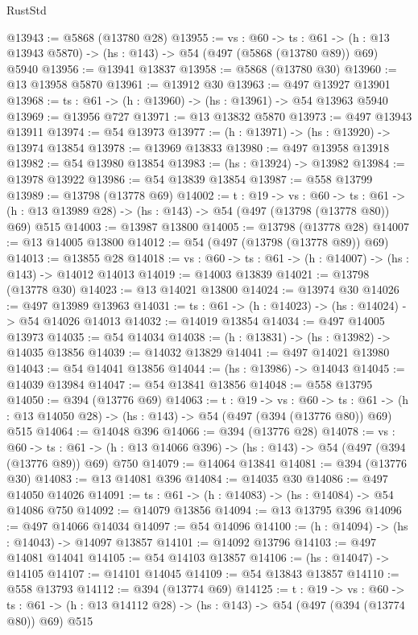 \begin{lexlean}{RustStd}
\begin{coremodule}
@13943 := @5868 (@13780 @28)
@13955 := {vs : @60} ->
  {ts : @61} -> (h : @13 @13943 @5870) -> (hs : @143) -> @54 (@497 (@5868 (@13780 @89)) @69) @5940
@13956 := @13941 @13837
@13958 := @5868 (@13780 @30)
@13960 := @13 @13958 @5870
@13961 := @13912 @30
@13963 := @497 @13927 @13901
@13968 := {ts : @61} -> (h : @13960) -> (hs : @13961) -> @54 @13963 @5940
@13969 := @13956 @727
@13971 := @13 @13832 @5870
@13973 := @497 @13943 @13911
@13974 := @54 @13973
@13977 := (h : @13971) -> (hs : @13920) -> @13974 @13854
@13978 := @13969 @13833
@13980 := @497 @13958 @13918
@13982 := @54 @13980 @13854
@13983 := (hs : @13924) -> @13982
@13984 := @13978 @13922
@13986 := @54 @13839 @13854
@13987 := @558 @13799
@13989 := @13798 (@13778 @69)
@14002 := {t : @19} ->
  {vs : @60} ->
  {ts : @61} -> (h : @13 @13989 @28) -> (hs : @143) -> @54 (@497 (@13798 (@13778 @80)) @69) @515
@14003 := @13987 @13800
@14005 := @13798 (@13778 @28)
@14007 := @13 @14005 @13800
@14012 := @54 (@497 (@13798 (@13778 @89)) @69)
@14013 := @13855 @28
@14018 := {vs : @60} -> {ts : @61} -> (h : @14007) -> (hs : @143) -> @14012 @14013
@14019 := @14003 @13839
@14021 := @13798 (@13778 @30)
@14023 := @13 @14021 @13800
@14024 := @13974 @30
@14026 := @497 @13989 @13963
@14031 := {ts : @61} -> (h : @14023) -> (hs : @14024) -> @54 @14026 @14013
@14032 := @14019 @13854
@14034 := @497 @14005 @13973
@14035 := @54 @14034
@14038 := (h : @13831) -> (hs : @13982) -> @14035 @13856
@14039 := @14032 @13829
@14041 := @497 @14021 @13980
@14043 := @54 @14041 @13856
@14044 := (hs : @13986) -> @14043
@14045 := @14039 @13984
@14047 := @54 @13841 @13856
@14048 := @558 @13795
@14050 := @394 (@13776 @69)
@14063 := {t : @19} ->
  {vs : @60} ->
  {ts : @61} -> (h : @13 @14050 @28) -> (hs : @143) -> @54 (@497 (@394 (@13776 @80)) @69) @515
@14064 := @14048 @396
@14066 := @394 (@13776 @28)
@14078 := {vs : @60} ->
  {ts : @61} -> (h : @13 @14066 @396) -> (hs : @143) -> @54 (@497 (@394 (@13776 @89)) @69) @750
@14079 := @14064 @13841
@14081 := @394 (@13776 @30)
@14083 := @13 @14081 @396
@14084 := @14035 @30
@14086 := @497 @14050 @14026
@14091 := {ts : @61} -> (h : @14083) -> (hs : @14084) -> @54 @14086 @750
@14092 := @14079 @13856
@14094 := @13 @13795 @396
@14096 := @497 @14066 @14034
@14097 := @54 @14096
@14100 := (h : @14094) -> (hs : @14043) -> @14097 @13857
@14101 := @14092 @13796
@14103 := @497 @14081 @14041
@14105 := @54 @14103 @13857
@14106 := (hs : @14047) -> @14105
@14107 := @14101 @14045
@14109 := @54 @13843 @13857
@14110 := @558 @13793
@14112 := @394 (@13774 @69)
@14125 := {t : @19} ->
  {vs : @60} ->
  {ts : @61} -> (h : @13 @14112 @28) -> (hs : @143) -> @54 (@497 (@394 (@13774 @80)) @69) @515

\end{coremodule}
\end{lexlean}
